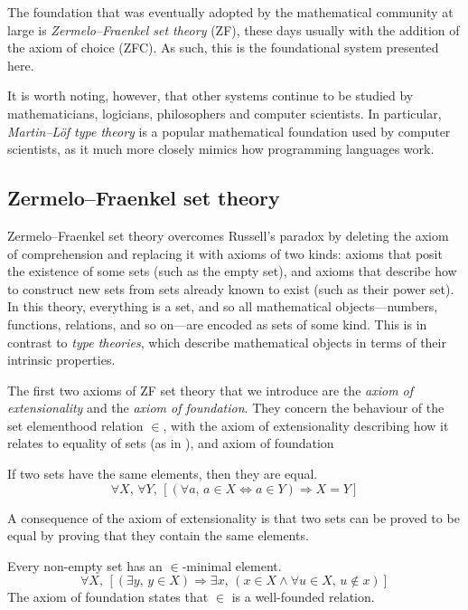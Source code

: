 The foundation that was eventually adopted by the mathematical community at large is \textit{Zermelo--Fraenkel set theory} (ZF), these days usually with the addition of the axiom of choice (ZFC). As such, this is the foundational system presented here.

It is worth noting, however, that other systems continue to be studied by mathematicians, logicians, philosophers and computer scientists. In particular, \textit{Martin--L\"{o}f type theory} is a popular mathematical foundation used by computer scientists, as it much more closely mimics how programming languages work.

\subsection*{Zermelo--Fraenkel set theory}

Zermelo--Fraenkel set theory overcomes Russell's paradox by deleting the axiom of comprehension and replacing it with axioms of two kinds: axioms that posit the existence of some sets (such as the empty set), and axioms that describe how to construct new sets from sets already known to exist (such as their power set). In this theory, everything is a set, and so all mathematical objects---numbers, functions, relations, and so on---are encoded as sets of some kind. This is in contrast to \textit{type theories}, which describe mathematical objects in terms of their intrinsic properties.

The first two axioms of ZF set theory that we introduce are the \textit{axiom of extensionality} and the \textit{axiom of foundation}. They concern the behaviour of the set elementhood relation $\in$, with the axiom of extensionality describing how it relates to equality of sets (as in ), and axiom of foundation 

\begin{axiom}
\label{axZFCExtensionality}
If two sets have the same elements, then they are equal.
\[ \forall X,\, \forall Y,\, [(\forall a,\, a \in X \Leftrightarrow a \in Y) \Rightarrow X=Y] \]
\end{axiom}

A consequence of the axiom of extensionality is that two sets can be proved to be equal by proving that they contain the same elements.

\begin{axiom}
Every non-empty set has an $\in$-minimal element.
\[ \forall X,\, [(\exists y,\, y \in X) \Rightarrow \exists x,\, (x \in X \wedge \forall u \in X,\, u \not \in x)] \]
The axiom of foundation states that $\in$ is a well-founded relation.
\end{axiom}

